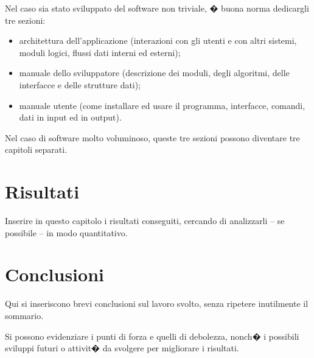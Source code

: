 \documentclass[pdfa%
,cucitura%
]{toptesi}
\begin{document}
Nel caso sia stato sviluppato del software non triviale, � buona norma dedicargli tre sezioni:
\begin{itemize}
\item architettura dell'applicazione (interazioni con gli utenti e con altri sistemi, moduli logici, flussi dati interni ed esterni);
\item manuale dello sviluppatore (descrizione dei moduli, degli algoritmi, delle interfacce e delle strutture dati);
\item manuale utente (come installare ed usare il programma, interfacce, comandi, dati in input ed in output).
\end{itemize}
Nel caso di software molto voluminoso, queste tre sezioni possono diventare tre capitoli separati.

\chapter{Risultati}

Inserire in questo capitolo i risultati conseguiti, cercando di analizzarli -- se possibile -- in modo quantitativo.


\chapter{Conclusioni}

Qui si inseriscono brevi conclusioni sul lavoro svolto, senza ripetere inutilmente il sommario.

Si possono evidenziare i punti di forza e quelli di debolezza, nonch� i possibili sviluppi futuri o attivit� da svolgere per migliorare i risultati.

\fi


\end{document}
